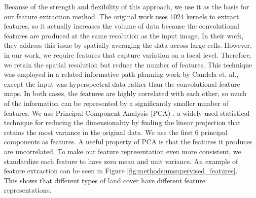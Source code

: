 Because of the strength and flexibility of this approach, we use it as the basis for our feature extraction method. The original work uses 1024 kernels to extract features, so it actually increases the volume of data because the convolutional features are produced at the same resolution as the input image. In their work, they address this issue by spatially averaging the data across large cells. However, in our work, we require features that capture variation on a local level. Therefore, we retain the spatial resolution but reduce the number of features. This technique was employed in a related informative path planning work by Candela et. al., except the input was hyperspectral data rather than the convolutional feature maps. In both cases, the features are highly correlated with each other, so much of the information can be represented by a significantly smaller number of features. We use Principal Component Analysis (PCA) \cite{Jollife2016PrincipalDevelopments}, a widely used statistical technique for reducing the dimensionality by finding the linear projection that retains the most variance in the original data. We use the first 6 principal components as features. A useful property of PCA is that the features it produces are uncorrelated. To make our feature representation even more consistent, we standardize each feature to have zero mean and unit variance. An example of feature extraction can be seen in Figure \ref{fig:methods:unsupervised_features}. This shows that different types of land cover have different feature representations.


